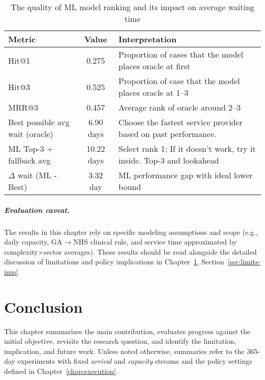 \documentclass[ %
                    author={Nattanan Nawakitbamrung},
                supervisor={Dr. Sébastien Rochat},
                    degree={MSc},
                     title={Developing and Evaluating the Impact of a Single Patient Treatment List (PTL) for an NHS Integrated Care System},
                  subtitle={},
                      type={},
                      year={2025}]{dissertation}
\begin{document}
\begin{table}[htbp]
\centering
\small
\begin{tabular}{l c l}
\toprule
\textbf{Metric} & \textbf{Value} & \textbf{Interpretation} \\
\midrule
Hit@1 & 0.275 & Proportion of cases that the model places oracle at first \\
Hit@3 & 0.525 & Proportion of case that the model places oracle at 1–3 \\
MRR@3 & 0.457 & Average rank of oracle around 2–3 \\
\midrule
Best possible avg wait (oracle) & 6.90 days & Choose the fastest service provider based on past performance. \\
ML Top-3 + fallback avg & 10.22 days & Select rank 1; If it doesn't work, try it inside. Top-3 and lookahead \\
$\Delta$ wait (ML - Best) & 3.32 day & ML performance gap with ideal lower bound \\
\bottomrule
\end{tabular}
\caption{The quality of ML model ranking and its impact on average waiting time}
\label{tab:ml-metrics}
\end{table}

\paragraph{Evaluation caveat.}
The results in this chapter rely on specific modeling assumptions and scope (e.g., daily capacity, GA$\rightarrow$NHS clinical rule, and service time approximated by complexity$\times$sector averages). These results should be read alongside the detailed discussion of limitations and policy implications in Chapter~\ref{chap:conclusion}, Section~\ref{sec:limits-imp}.



\chapter{Conclusion}
\label{chap:conclusion}

This chapter summarizes the main contribution, evaluates progress against the initial objective, revisits the research question, and identify the limitation, implication, and future work. Unless noted otherwise, summaries refer to the 365-day experiments with fixed \emph{arrival} and \emph{capacity} streams and the policy settings defined in Chapter~\ref{chap:execution}.
\end{document}

